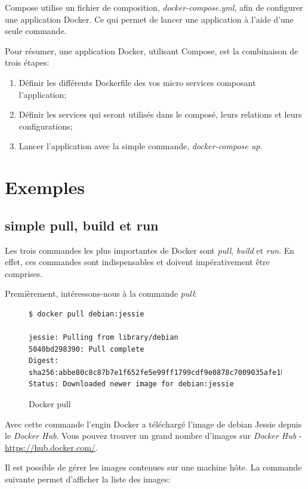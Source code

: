Compose utilise un fichier de composition, \emph{docker-compose.yml}, afin de configurer une application Docker. Ce qui permet de lancer une application à l'aide d'une seule commande. 

Pour résumer, une application Docker, utilisant Compose, est la combinaison de trois étapes:

\begin{enumerate}
\item Définir les différents Dockerfile des vos micro services composant l'application;
\item Définir les services qui seront utilisés dans le composé, leurs relations et leurs configurations;
\item Lancer l'application avec la simple commande, \emph{docker-compose up}.
\end{enumerate}

\section{Exemples}
\subsection{simple pull, build et run}
Les trois commandes les plus importantes de Docker sont \emph{pull}, \emph{build} et \emph{run}. En effet, ces commandes sont indispensables et doivent impérativement être comprises.

Premièrement, intéressons-nous à la commande \emph{pull}:

\begin{figure}[H] 
\centering 
\begin{lstlisting}[frame=single]
$ docker pull debian:jessie

jessie: Pulling from library/debian
5040bd298390: Pull complete 
Digest: sha256:abbe80c8c87b7e1f652fe5e99ff1799cdf9e0878c7009035afe1bccac129cad8
Status: Downloaded newer image for debian:jessie
\end{lstlisting}
\caption[Code - Docker pull]{Docker pull}
\label{fig:dockerPull} 
\end{figure}

Avec cette commande l'engin Docker a téléchargé l'image de debian Jessie depuis le \emph{Docker Hub}. Vous pouvez trouver un grand nombre d'images sur \emph{Docker Hub} - \hyperref[Docker Hub]{https://hub.docker.com/}.

Il est possible de gérer les images contenues sur une machine hôte. La commande suivante permet d'afficher la liste des images:

